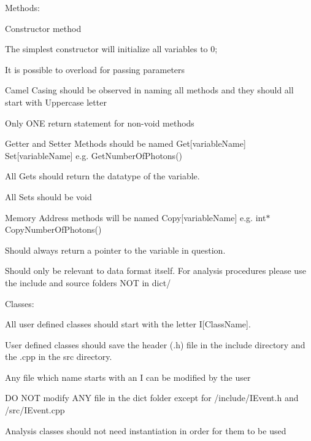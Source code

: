 Methods\+:
\begin{DoxyItemize}
\item Constructor method
\begin{DoxyItemize}
\item The simplest constructor will initialize all variables to 0;
\item It is possible to overload for passing parameters
\end{DoxyItemize}
\item Camel Casing should be observed in naming all methods and they should all start with Uppercase letter
\item Only O\+NE return statement for non-\/void methods
\item Getter and Setter Methods should be named Get\mbox{[}variable\+Name\mbox{]} Set\mbox{[}variable\+Name\mbox{]} e.\+g. Get\+Number\+Of\+Photons()
\begin{DoxyItemize}
\item All Gets should return the datatype of the variable.
\item All Sets should be void
\end{DoxyItemize}
\item Memory Address methods will be named Copy\mbox{[}variable\+Name\mbox{]} e.\+g. int$\ast$ Copy\+Number\+Of\+Photons()
\begin{DoxyItemize}
\item Should always return a pointer to the variable in question.
\end{DoxyItemize}
\item Should only be relevant to data format itself. For analysis procedures please use the include and source folders N\+OT in dict/
\end{DoxyItemize}

Classes\+:
\begin{DoxyItemize}
\item All user defined classes should start with the letter I\mbox{[}Class\+Name\mbox{]}.
\item User defined classes should save the header (.h) file in the include directory and the .cpp in the src directory.
\item Any file which name starts with an I can be modified by the user
\item DO N\+OT modify A\+NY file in the dict folder except for /include/\+I\+Event.h and /src/\+I\+Event.cpp
\item Analysis classes should not need instantiation in order for them to be used
\end{DoxyItemize}

